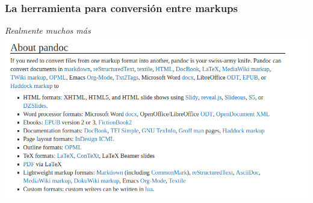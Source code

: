 \documentclass[svgnames]{beamer}
\begin{document}
\begin{frame}
  \frametitle{La herramienta para conversión entre markups}
  \emph{Realmente muchos más}
  \includegraphics[width=1\textwidth]{graficos/pandoc}
\end{frame}
\end{document}

